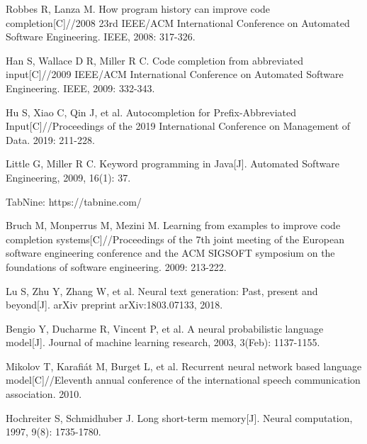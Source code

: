 \documentclass[PRO,english]{ipsj}
\begin{document}
\begin{thebibliography}{10}
 Robbes R, Lanza M. How program history can improve code completion[C]//2008 23rd IEEE/ACM International Conference on Automated Software Engineering. IEEE, 2008: 317-326.

 Han S, Wallace D R, Miller R C. Code completion from abbreviated input[C]//2009 IEEE/ACM International Conference on Automated Software Engineering. IEEE, 2009: 332-343.

 Hu S, Xiao C, Qin J, et al. Autocompletion for Prefix-Abbreviated Input[C]//Proceedings of the 2019 International Conference on Management of Data. 2019: 211-228.

 Little G, Miller R C. Keyword programming in Java[J]. Automated Software Engineering, 2009, 16(1): 37.

 TabNine: https://tabnine.com/

 Bruch M, Monperrus M, Mezini M. Learning from examples to improve code completion systems[C]//Proceedings of the 7th joint meeting of the European software engineering conference and the ACM SIGSOFT symposium on the foundations of software engineering. 2009: 213-222.

 Lu S, Zhu Y, Zhang W, et al. Neural text generation: Past, present and beyond[J]. arXiv preprint arXiv:1803.07133, 2018.

 Bengio Y, Ducharme R, Vincent P, et al. A neural probabilistic language model[J]. Journal of machine learning research, 2003, 3(Feb): 1137-1155.

 Mikolov T, Karafiát M, Burget L, et al. Recurrent neural network based language model[C]//Eleventh annual conference of the international speech communication association. 2010.


 Hochreiter S, Schmidhuber J. Long short-term memory[J]. Neural computation, 1997, 9(8): 1735-1780.

\end{thebibliography}
\end{document}

